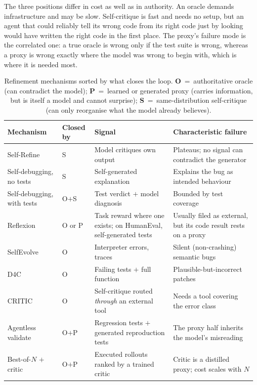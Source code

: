 \documentclass[
  english,        %
  font=times,     %
  twocolumn,      %
]{tumarticle}
\begin{document}
The three positions differ in cost as well as in authority. An oracle demands
infrastructure and may be slow. Self-critique is fast and needs no setup, but an
agent that could reliably tell its wrong code from its right code just by looking
would have written the right code in the first place. The proxy's failure mode is the
correlated one: a true oracle is wrong only if the test suite is wrong, whereas a
proxy is wrong exactly where the model was wrong to begin with, which is where it
is needed most.

\begin{table}[t]
  \centering
  \caption{Refinement mechanisms sorted by what closes the loop.
    \textbf{O}~=~authoritative oracle (can contradict the model);
    \textbf{P}~=~learned or generated proxy (carries information, but is itself a
    model and cannot surprise);
    \textbf{S}~=~same-distribution self-critique (can only reorganise what the
    model already believes).}
  \label{tab:loop-closure}
  \scriptsize
  \setlength{\tabcolsep}{3pt}
  \begin{tabular}{@{}p{}p{}p{}p{}@{}}
    \toprule
    \textbf{Mechanism} & \textbf{Closed by} & \textbf{Signal}
      & \textbf{Characteristic failure} \\
    \midrule
    Self-Refine~\cite{madaan2023selfrefine}
      & S & Model critiques own output
      & Plateaus; no signal can contradict the generator \\
    Self-debugging, no tests~\cite{chen2024selfdebug}
      & S & Self-generated explanation
      & Explains the bug as intended behaviour \\
    Self-debugging, with tests~\cite{chen2024selfdebug}
      & O$+$S & Test verdict $+$ model diagnosis
      & Bounded by test coverage \\
    Reflexion~\cite{shinn2023reflexion}
      & O or P & Task reward where one exists; on HumanEval, self-generated tests
      & Usually filed as external, but its code result rests on a proxy \\
    SelfEvolve~\cite{jiang2023selfevolve}
      & O & Interpreter errors, traces
      & Silent (non-crashing) semantic bugs \\
    D4C~\cite{xu2024d4c}
      & O & Failing tests $+$ full function
      & Plausible-but-incorrect patches \\
    CRITIC~\cite{gou2024critic}
      & O & Self-critique routed \emph{through} an external tool
      & Needs a tool covering the error class \\
    Agentless validate~\cite{xia2024agentless}
      & O$+$P & Regression tests $+$ generated reproduction tests
      & The proxy half inherits the model's misreading \\
    Best-of-$N$ $+$ critic~\cite{openhands2025verified}
      & O$+$P & Executed rollouts ranked by a trained critic
      & Critic is a distilled proxy; cost scales with $N$ \\
    \bottomrule
  \end{tabular}
\end{table}
\end{document}
